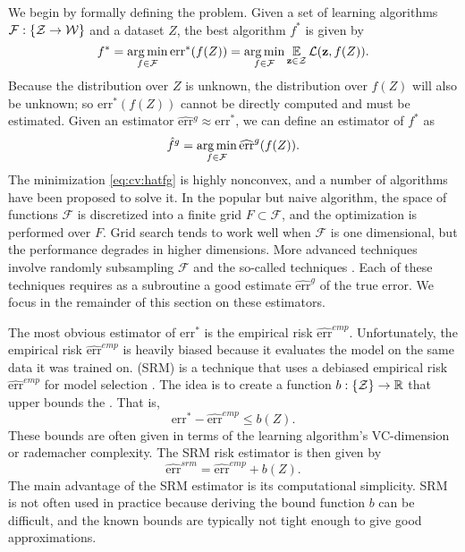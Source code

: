 \documentclass[thesis.tex]{subfiles}
\newcommand{\set}[1]{\mathcal {#1}}
\newcommand{\riskstar}{{\textrm{err}^*}}
\newcommand{\riskhat}{\widehat{\textrm{err}}}
\newcommand{\riskemp}{\widehat{\textrm{err}}^\textit{emp}}
\newcommand{\risksrm}{\widehat{\textrm{err}}^\textit{srm}}
\begin{document}
We begin by formally defining the  problem.
Given a set of learning algorithms $\set F : \{\Z \to \W\}$ and a dataset $Z$,
the best algorithm $f^*$ is given by
\begin{equation}
    f^*
    = \argmin_{f\in\set F} \riskstar(f(Z))
    = \argmin_{f\in\set F} \E_{\z\in\Z}\Loss(\z,f(Z))
    .
\end{equation}
Because the distribution over $Z$ is unknown, 
the distribution over $f(Z)$ will also be unknown;
so $\riskstar(f(Z))$ cannot be directly computed and must be estimated.
Given an estimator $\riskhat{}^g \approx \riskstar$,
we can define an estimator of $f^*$ as
\begin{equation}
    \label{eq:cv:hatfg}
    \hat f^g = \argmin_{f\in\set F} \riskhat^g(f(Z))
    .
\end{equation}
The minimization \eqref{eq:cv:hatfg} is highly nonconvex,
and a number of algorithms have been proposed to solve it.
In the popular but naive  algorithm,
the space of functions $\set F$ is discretized into a finite grid $F\subset\set F$,
and the optimization is performed over $F$.
Grid search tends to work well when $\set F$ is one dimensional,
but the performance degrades in higher dimensions.
More advanced techniques involve randomly subsampling $\set F$ \citep{bergstra2012random} and the so-called  techniques \citep[e.g.][]{snoek2012practical,feurer2015efficient}.
Each of these techniques requires as a subroutine a good estimate $\riskhat^g$ of the true error.
We focus in the remainder of this section on these estimators.

The most obvious estimator of $\riskstar$ is the empirical risk $\riskemp$.
Unfortunately, the empirical risk $\riskemp$ is heavily biased because it evaluates the model on the same data it was trained on.
 (SRM) is a technique that uses a debiased empirical risk $\riskemp$ for model selection
\citep[Chapter 7 of ][]{shalev2014understanding}.
The idea is to create a function $b : \{{\mathcal Z}\} \to \mathbb R$ that upper bounds the .
That is,
\begin{equation}
    \riskstar-    \riskemp\le b(Z)
    .
\end{equation}
These bounds are often given in terms of the learning algorithm's VC-dimension or rademacher complexity.
The SRM risk estimator is then given by
\begin{equation}
    \risksrm 
    = \riskemp + b(Z) 
    .
\end{equation}
The main advantage of the SRM estimator is its computational simplicity.
SRM is not often used in practice because deriving the bound function $b$ can be difficult,
and the known bounds are typically not tight enough to give good approximations.
\end{document}
